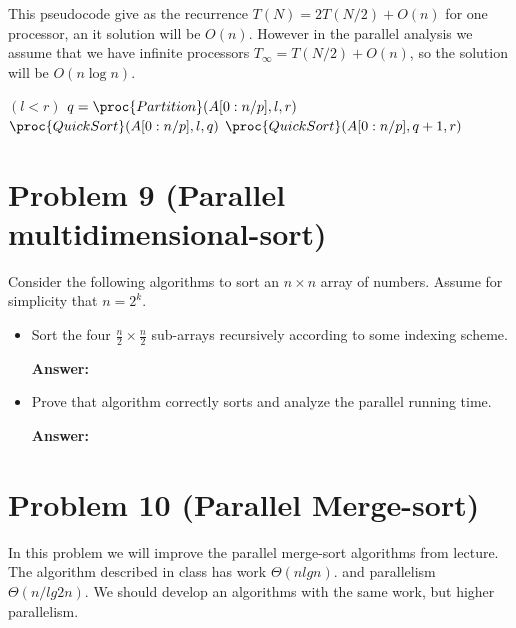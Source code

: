 \documentclass{article}
\begin{document}
This pseudocode give as the recurrence $T(N) = 2 T(N/2) + O(n)$ for one processor, an it solution will be $O(n)$. However in the parallel analysis we assume that we have infinite processors $T_{\infty}= T(N/2) +O(n)$, so the solution will be $O(n\log n)$. 

\begin{codebox}
\li \If $(l<r)$ \Do
\li $q = \proc{Partition}(A[0:n/p], l, r)$
\li $\proc{QuickSort}(A[0:n/p],l, q)$
\li $\proc{QuickSort}(A[0:n/p],q+1, r)$ \End
\li {}
\end{codebox}
\section*{Problem 9 (Parallel multidimensional-sort)}

Consider the following algorithms to sort an $n\times n$ array of numbers.  Assume for simplicity that $n=2^k$.

\begin{itemize}
    \item Sort the four $\frac{n}{2} \times \frac{n}{2}$ sub-arrays recursively according to some indexing scheme.
    
    \textbf{Answer:}
    
    \item Prove that algorithm correctly sorts and analyze the parallel running time.
    
    \textbf{Answer:}
\end{itemize}

\section*{Problem 10 (Parallel Merge-sort)}

In this problem we will improve the parallel merge-sort algorithms from lecture.   The algorithm described in class has work $\Theta(n lgn)$.  and parallelism $\Theta(n/lg2n)$.  We should develop an algorithms with the same work, but higher parallelism.
\end{document}
